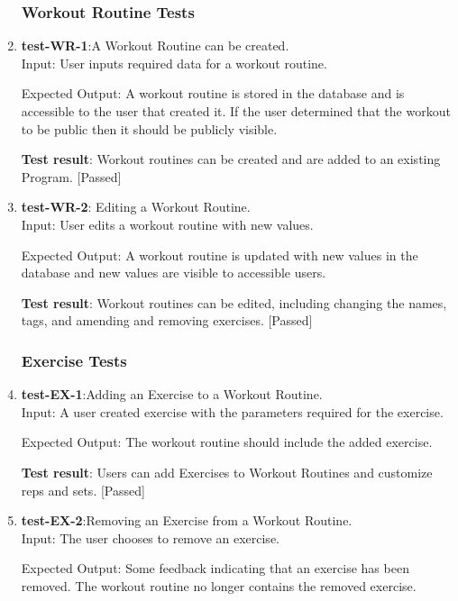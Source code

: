\documentclass[12pt, titlepage]{article}
\begin{document}
\begin{enumerate}
   
\subsubsection{Workout Routine Tests}
    \item{\textbf{test-WR-1}}:A Workout Routine can be created.\\
    Input: User inputs required data for a workout routine.
	
    Expected Output: A workout routine is stored in the database and is accessible to the user that created it. If the user determined that the workout to be public then it should be publicly visible.
    
    \textbf{Test result}: Workout routines can be created and are added to an existing Program. [Passed]
   
    \item{\textbf{test-WR-2}}: Editing a Workout Routine.\\
    Input: User edits a workout routine with new values.
	
    Expected Output: A workout routine is updated with new values in the database and new values are visible to accessible users.
    
    \textbf{Test result}: Workout routines can be edited, including changing the names, tags, and amending and removing exercises. [Passed]
   
\subsubsection{Exercise Tests}
    \item{\textbf{test-EX-1}}:Adding an Exercise to a Workout Routine.\\
    Input: A user created exercise with the parameters required for the exercise.

    Expected Output: The workout routine should include the added exercise.
    
    \textbf{Test result}: Users can add Exercises to Workout Routines and customize reps and sets. [Passed]
   
    \item{\textbf{test-EX-2}}:Removing an Exercise from a Workout Routine.\\
    Input: The user chooses to remove an exercise.
	
    Expected Output: Some feedback indicating that an exercise has been removed. The workout routine no longer contains the removed exercise.
    

\end{enumerate}
\end{document}
